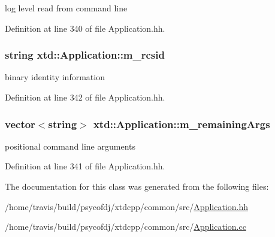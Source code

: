 log level read from command line 



Definition at line 340 of file Application.\-hh.

\hypertarget{classxtd_1_1Application_ad820953bc15b729ce010f422595d3a3f}{
\subsubsection[{m\-\_\-rcsid}]{\setlength{\rightskip}{0pt plus 5cm}string xtd\-::\-Application\-::m\-\_\-rcsid\hspace{0.3cm}{\ttfamily [protected]}}}\label{classxtd_1_1Application_ad820953bc15b729ce010f422595d3a3f}


binary identity information 



Definition at line 342 of file Application.\-hh.

\hypertarget{classxtd_1_1Application_a7651fd3849530cdded556187a6b42c25}{
\subsubsection[{m\-\_\-remaining\-Args}]{\setlength{\rightskip}{0pt plus 5cm}vector$<$string$>$ xtd\-::\-Application\-::m\-\_\-remaining\-Args\hspace{0.3cm}{\ttfamily [protected]}}}\label{classxtd_1_1Application_a7651fd3849530cdded556187a6b42c25}


positional command line arguments 



Definition at line 341 of file Application.\-hh.



The documentation for this class was generated from the following files\-:\begin{DoxyCompactItemize}
\item 
/home/travis/build/psycofdj/xtdcpp/common/src/\hyperlink{src_2Application_8hh}{Application.\-hh}\item 
/home/travis/build/psycofdj/xtdcpp/common/src/\hyperlink{Application_8cc}{Application.\-cc}\end{DoxyCompactItemize}
